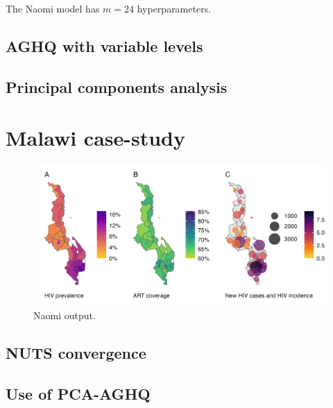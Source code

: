 \documentclass[a4paper, nobind]{templates/ociamthesis}
\begin{document}
The Naomi model has \(m = 24\) hyperparameters.

\hypertarget{aghq-with-variable-levels}{%
\subsection{AGHQ with variable levels}\label{aghq-with-variable-levels}}

\hypertarget{principal-components-analysis}{%
\subsection{Principal components analysis}\label{principal-components-analysis}}

\hypertarget{malawi-case-study}{%
\section{Malawi case-study}\label{malawi-case-study}}

\begin{figure}

{\centering \includegraphics[width=0.95\linewidth]{resources/naomi-aghq/20230811-095752-5b8181d8/depends/figB} 

}

\caption{Naomi output.}\label{fig:figB}
\end{figure}

\hypertarget{nuts-convergence}{%
\subsection{NUTS convergence}\label{nuts-convergence}}

\hypertarget{use-of-pca-aghq}{%
\subsection{Use of PCA-AGHQ}\label{use-of-pca-aghq}}
\end{document}
